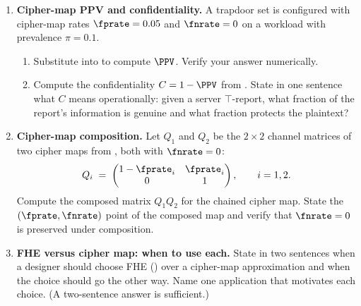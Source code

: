 \begin{enumerate}


\item \exstar
\label{ex:ch17-1}
\textbf{Cipher-map PPV and confidentiality.}
A trapdoor set is configured with cipher-map rates $\fprate =
0.05$ and $\fnrate = 0$ on a workload with prevalence $\pi =
0.1$.
\begin{enumerate}
  \item[(a)] Substitute into  to compute $\PPV$.
    Verify your answer numerically.
  \item[(b)] Compute the confidentiality $C = 1 - \PPV$ from
    . State in one sentence
    what $C$ means operationally: given a server $\top$-report,
    what fraction of the report's information is genuine and
    what fraction protects the plaintext?
\end{enumerate}

\item \exstar
\label{ex:ch17-2}
\textbf{Cipher-map composition.}
Let $Q_1$ and $Q_2$ be the $2 \times 2$ channel matrices of two
cipher maps from , both with
$\fnrate = 0$:
\[
  Q_i \;=\;
  \begin{pmatrix}
    1 - \fprate_i & \fprate_i \\
    0             & 1
  \end{pmatrix},
  \qquad i = 1, 2.
\]
Compute the composed matrix $Q_1 Q_2$ for the chained cipher map.
State the $(\fprate, \fnrate)$ point of the composed map and
verify that $\fnrate = 0$ is preserved under composition.

\item \exstar
\label{ex:ch17-3}
\textbf{FHE versus cipher map: when to use each.}
State in two sentences when a designer should choose FHE
() over a cipher-map approximation and
when the choice should go the other way. Name one application
that motivates each choice. (A two-sentence answer is
sufficient.)



\end{enumerate}
